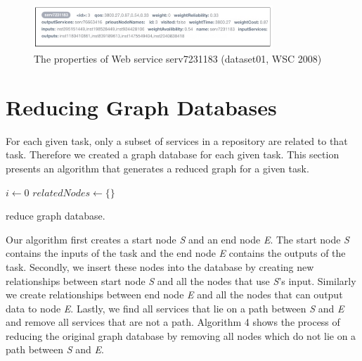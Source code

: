 \begin{figure}[H]
\includegraphics[width=9cm]{The-properties-of-Web-service-serv7231183.png}
\centering
\caption{The properties of Web service serv7231183 (dataset01, WSC 2008)}
\label{fig:servProp} 
\end{figure} 

\section{Reducing Graph Databases}
For each given task, only a subset of services in a repository are related to that task. Therefore we created a graph database for each given task. This section presents an algorithm that generates a reduced graph for a given task. \\

\begin{algorithm}[H]
 \LinesNumbered
 \SetNlSty{}{}{:}
 $i \leftarrow 0$\;
 $relatedNodes \leftarrow \{\}$\;
 \caption{\footnotesize reduce graph database.}
\label{generation}
\end{algorithm}
\par

Our algorithm first creates a start node \emph{S} and an end node \emph{E}. The start node \emph{S} contains the inputs of the task and the end node \emph{E}  contains the outputs of the task. Secondly, we insert these nodes into the database by creating new relationships between start node \emph{S} and all the nodes that use \emph{S}'s input. Similarly we create relationships between end node \emph{E} and all the nodes that can output data to node \emph{E}. Lastly, we find all services that lie on a path between \emph{S} and \emph{E} and remove all services that are not a path. Algorithm 4 shows the process of reducing the original graph database by removing all nodes which do not lie on a path between \emph{S} and \emph{E}.


